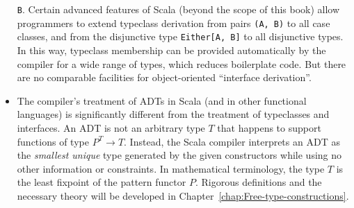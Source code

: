 \begin{itemize}
\lstinline!B!. Certain advanced features of Scala (beyond the scope
of this book) allow programmers to extend typeclass derivation from
pairs \lstinline!(A, B)! to all case classes, and from the disjunctive
type \lstinline!Either[A, B]! to all disjunctive types. In this way,
typeclass membership can be provided automatically by the compiler
for a wide range of types, which reduces boilerplate code. But there
are no comparable facilities for object-oriented \textsf{``}interface derivation\textsf{''}. 
\item The compiler\textsf{'}s treatment of ADTs in Scala (and in other functional
languages) is significantly different from the treatment of typeclasses
and interfaces. An ADT is not an arbitrary type $T$ that happens
to support functions of type $P^{T}\rightarrow T$. Instead, the Scala
compiler interprets an ADT as the \emph{smallest unique} type generated
by the given constructors while using no other information or constraints.
In mathematical terminology, the type $T$ is the least fixpoint of
the pattern functor $P$. Rigorous definitions and the necessary theory
will be developed in Chapter~\ref{chap:Free-type-constructions}.
\end{itemize}
